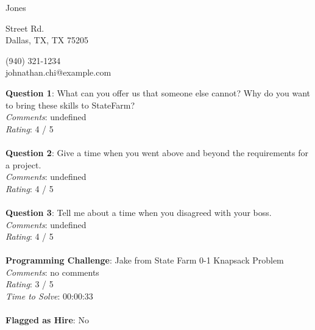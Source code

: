 \documentclass[12pt]{article}
\begin{document}
{\LARGE \begin{center}Jones \end{center}}

\begin{multicols}{2}
 Street Rd. \\
Dallas, TX, TX 75205
\columnbreak

\noindent
(940) 321-1234 \\
johnathan.chi@example.com
\end{multicols}

\noindent
\textbf{Question 1}: What can you offer us that someone else cannot? Why do you want to bring these skills to StateFarm?
\\\noindent
\textit{Comments}: undefined
\\\noindent
\textit{Rating}: 4 / 5
\\\\
\noindent
\textbf{Question 2}: Give a time when you went above and beyond the requirements for a project.
\\\noindent
\textit{Comments}: undefined
\\\noindent
\textit{Rating}: 4 / 5
\\\\
\noindent
\textbf{Question 3}: Tell me about a time when you disagreed with your boss.
\\\noindent
\textit{Comments}: undefined
\\\noindent
\textit{Rating}: 4 / 5
\\\\
\noindent
\textbf{Programming Challenge}: Jake from State Farm 0-1 Knapsack Problem
\\\noindent
\textit{Comments}: no comments
\\\noindent
\textit{Rating}: 3 / 5
\\\noindent
\textit{Time to Solve}: 00:00:33
\\\\
\textbf{Flagged as Hire}: No
\\\\ 
\end{document}
